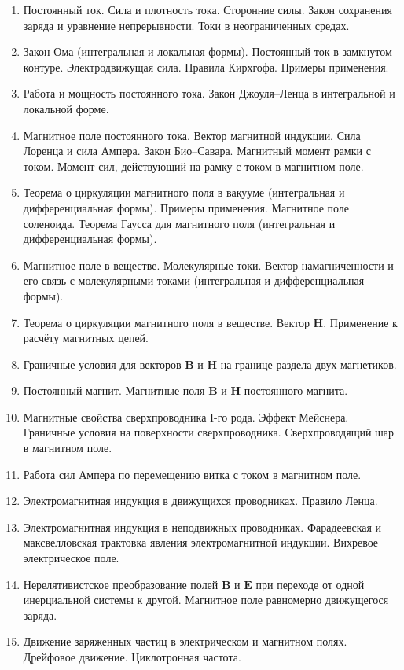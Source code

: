 \documentclass[9pt,a4paper]{article}
\begin{document}
\begin{enumerate}
\item Постоянный ток. Сила и плотность тока. Сторонние силы. Закон сохранения заряда и уравнение непрерывности. Токи в неограниченных
средах.
\item Закон Ома (интегральная и локальная формы). Постоянный ток в замкнутом контуре. Электродвижущая сила. Правила Кирхгофа.
Примеры применения.
\item Работа и мощность постоянного тока. Закон Джоуля–Ленца в интегральной и локальной форме.
\item Магнитное поле постоянного тока. Вектор магнитной индукции. Сила Лоренца и сила Ампера. Закон Био–Савара. Магнитный момент
рамки с током. Момент сил, действующий на рамку с током в магнитном поле.
\item Теорема о циркуляции магнитного поля в вакууме (интегральная и дифференциальная формы). Примеры применения. Магнитное поле соленоида. Теорема Гаусса для магнитного поля (интегральная и дифференциальная формы).
\item Магнитное поле в веществе. Молекулярные токи. Вектор намагниченности и его связь с молекулярными токами (интегральная и дифференциальная формы).
\item Теорема о циркуляции магнитного поля в веществе. Вектор  $\mathbf{H}$. Применение к расчёту магнитных цепей.
\item Граничные условия для векторов $\mathbf{B}$ и  $\mathbf{H}$ на границе раздела двух магнетиков.
\item Постоянный магнит. Магнитные поля  $\mathbf{B}$ и  $\mathbf{H}$ постоянного магнита.
\item Магнитные свойства сверхпроводника I-го рода. Эффект Мейснера. Граничные условия на поверхности сверхпроводника.
Сверхпроводящий шар в магнитном поле.
\item Работа сил Ампера по перемещению витка с током в магнитном поле.
\item Электромагнитная индукция в движущихся проводниках. Правило Ленца.
\item Электромагнитная индукция в неподвижных проводниках. Фарадеевская и максвелловская трактовка явления электромагнитной индукции. Вихревое электрическое поле.
\item Нерелятивистское преобразование полей  $\mathbf{B}$ и  $\mathbf{E}$ при переходе от одной инерциальной системы к другой. Магнитное поле равномерно
движущегося заряда.
\item Движение заряженных частиц в электрическом и магнитном полях. Дрейфовое движение. Циклотронная частота.

\end{enumerate}
\end{document}
